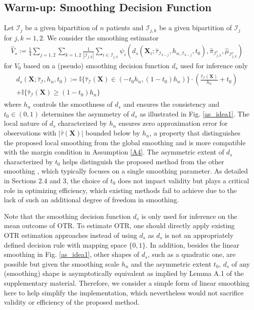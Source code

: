 \documentclass[11pt]{article}
\theoremstyle{referenceplain}
\theoremstyle{referencedefinition}
\theoremstyle{referenceremark}
\begin{document}
\subsection{Warm-up: Smoothing Decision Function}
Let $\mathcal{I}_j$ be a given bipartition of $n$ patients and $\mathcal{I}_{j,k}$ be a given bipartition of $\mathcal{I}_j$ for $j,k=1,2$. We consider the smoothing estimator 
\begin{align}\label{smoothing-estimator}
      \widehat{V}_{s}:=\frac{1}{4}\sum_{j=1,2}\sum_{k=1,2}\frac{1}{|\mathcal{I}_{j,k}|}\sum_{i\in\mathcal{I}_{j,k}}\psi_i(d_{s}(\mathbf{X}_i;\widehat{\tau}_{\mathcal{I}_{3-j}},h_{n,\mathcal{I}_{3-j}},t_0),\widehat{\pi}_{\mathcal{I}_{j,k}^c},\widehat{\mu}_{\mathcal{I}_{j,k}^c})
\end{align}
for $V_0$ based on a (pseudo) smoothing decision function $d_{s}$ used for inference only
\begin{align}
\label{smoothing-function}
\begin{aligned}
    d_{s}(\mathbf{X};\widehat{\tau}_{\mathcal{I}},h_n,t_0):=\mathbb{I}\{\widehat{\tau}_{\mathcal{I}}(\mathbf{X})\in(-t_0 h_n, (1-t_0)h_n)\}\cdot \left(\frac{\widehat{\tau}_{\mathcal{I}}(\mathbf{X})}{h_n}+t_0\right)\\
    +\mathbb{I}\{\widehat{\tau}_{\mathcal{I}}(\mathbf{X})\ge (1-t_0)h_n\}
\end{aligned}
\end{align}
where $h_n$ controls the smoothness of $d_{s}$ and ensures the consistency and $t_0\in (0,1)$ determines the asymmetry of $d_{s}$ as illustrated in Fig. \ref{as_idea1}. The local nature of $d_s$ characterized by $h_n$ ensures 
    zero approximation error for observations with $|\widehat{\tau}(\mathbf{X})|$ bounded below by $h_n$, 
    a property that distinguishes the proposed local smoothing from the global smoothing \citep{levis2025covariate} and is more compatible with the margin condition in Assumption \ref{A4}. The asymmetric extent of $d_s$ characterized by $t_0$ helps distinguish the proposed method from the other smoothing \citep{wu2021resampling,chen2023inference,whitehouse2025inference}, which typically focuses on a single smoothing parameter. As detailed in Sections 2.4 and 3, the choice of $t_0$ does not impact validity but plays a critical role in optimizing efficiency, which existing methods fail to achieve due to the lack of such an additional degree of freedom in smoothing. 
    
    Note that the smoothing decision function $d_s$ is only used for inference on the mean outcome of OTR. To estimate OTR, one should directly apply existing OTR estimation approaches instead of using $d_s$ as $d_s$ is not an appropriately defined decision rule with mapping space $\{0,1\}$. In addition, besides the linear smoothing in Fig. \ref{as_idea1}, other shapes of $d_s$, such as a quadratic one, are possible but given the smoothing scale $h_n$ and the asymmetric extent $t_0$, $d_s$ of any (smoothing) shape is asymptotically equivalent as implied by Lemma A.1 of the supplementary material. Therefore, we consider a simple form of linear smoothing here to help simplify the implementation, which nevertheless would not sacrifice validity or efficiency of the proposed method.  
\end{document}
